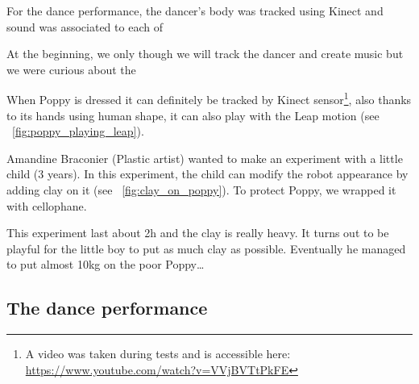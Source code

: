 For the dance performance, the dancer's body was tracked using Kinect and sound was associated to each of

At the beginning, we only though we will track the dancer and create music but we were curious about the

When Poppy is dressed it can definitely be tracked by Kinect sensor\footnote{A video was taken during tests and is accessible here: \url{https://www.youtube.com/watch?v=VVjBVTtPkFE}}, also thanks to its hands using human shape, it can also play with the Leap motion (see \figurename~\ref{fig:poppy_playing_leap}).

\begin{NFfigure}
\centering
    \hfil
    \caption{}
    \label{fig:}
\end{NFfigure}

Amandine Braconier (Plastic artist) wanted to make an experiment with a little child (3 years). In this experiment, the child can modify the robot appearance by adding clay on it (see \figurename~\ref{fig:clay_on_poppy}). To protect Poppy, we wrapped it with cellophane.

This experiment last about 2h and the clay is really heavy. It turns out to be playful for the little boy to put as much clay as possible. Eventually he managed to put almost 10kg on the poor Poppy\dots

\begin{NFfigure}
\centering
    \hfil
    \caption{}
    \label{fig:clay_on_poppy}
\end{NFfigure}


\subsection{The dance performance} %

